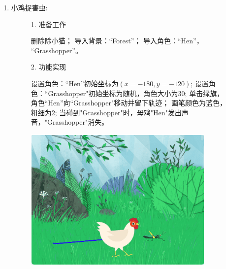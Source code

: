 \documentclass[10pt, a4paper]{article}
\begin{document}
\begin{enumerate}
        \item 小鸡捉害虫:
        \begin{figure}[htbp]
            \begin{minipage}{.6\textwidth}
                1. 准备工作
                \begin{tasks}[label = (\arabic*)]
                    \task 删除除小猫；
                    \task 导入背景：“Forest”；
                    \task 导入角色：“Hen”， “Grasshopper”。
                \end{tasks}
                2. 功能实现
                \begin{tasks}[label = (\arabic*)]
                    \task 设置角色：“Hen”初始坐标为$(x=-180,y=-120)$;
                    \task 设置角色：“Grasshopper"初始坐标为随机，角色大小为30;
                    \task 单击绿旗，角色“Hen”向“Grasshopper"移动并留下轨迹；
                    \task 画笔颜色为蓝色，粗细为2;
                    \task 当碰到"Grasshopper"时，母鸡"Hen"发出声音，"Grasshopper"消失。
                \end{tasks}
            \end{minipage}
            \begin{minipage}{.37\textwidth}
                \centering
                \includegraphics[width=\textwidth]{37.png}
            \end{minipage}
        \end{figure}
    \end{enumerate}
\end{document}
